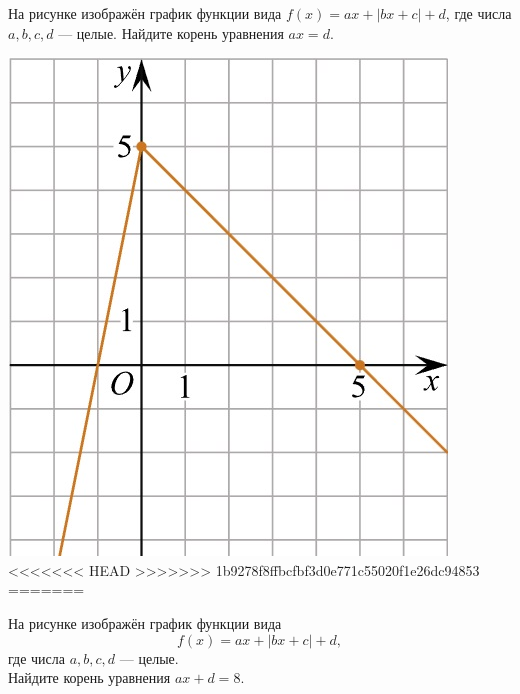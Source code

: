 \begin{class}[number=5]
\begin{listofex}
\begin{minipage}[t]{\bodywidth}
\begin{minipage}[t]{\bodywidth}
\begin{minipage}[t]{\bodywidth}
\begin{minipage}[t]{\bodywidth}
\begin{minipage}[t]{0.43\textwidth}
\begin{minipage}[t]{\bodywidth}
\begin{minipage}[t]{0.43\textwidth}
\begin{minipage}[t]{\bodywidth}
\begin{minipage}[t]{0.43\textwidth}
\begin{minipage}[t]{\bodywidth}
\begin{minipage}[t]{0.43\textwidth}
\begin{minipage}[t]{\bodywidth}
\begin{minipage}[t]{\bodywidth}
\begin{minipage}[t]{\bodywidth}
\begin{minipage}[t]{0.43\textwidth}
\begin{minipage}[t]{0.43\textwidth}
\begin{minipage}[t]{\bodywidth}
\begin{minipage}[t]{0.43\textwidth}
\begin{minipage}[t]{\bodywidth}
\begin{minipage}[t]{0.43\textwidth}
\begin{minipage}[t]{\picwidth}
		\begin{minipage}[t]{0.43\textwidth}
			На рисунке изображён график функции вида \(f(x)=ax+|bx+c|+d\), где числа \(a, b, c, d\) --- целые. Найдите корень уравнения \(ax=d\).
		\end{minipage}
		\begin{minipage}[c]{0.27\textwidth}
			\includegraphics[align=t, width=\textwidth]{../pics/G101M4C5-10.jpg}
<<<<<<< HEAD
>>>>>>> 1b9278f8ffbcfbf3d0e771c55020f1e26dc94853
=======
		\begin{minipage}[t]{\bodywidth}
			На рисунке изображён график функции вида \[ f(x)=ax+|bx+c|+d, \] где числа \(a, b, c, d\) --- целые.\\ Найдите корень уравнения \(ax+d=8\).
		\end{minipage}
		\hspace{0.05\linewidth}

\end{minipage}
\end{minipage}
\end{minipage}
\end{minipage}
\end{minipage}
\end{minipage}
\end{minipage}
\end{minipage}
\end{minipage}
\end{minipage}
\end{minipage}
\end{minipage}
\end{minipage}
\end{minipage}
\end{minipage}
\end{minipage}
\end{minipage}
\end{minipage}
\end{minipage}
\end{minipage}
\end{minipage}
\end{minipage}
\end{listofex}
\end{class}
